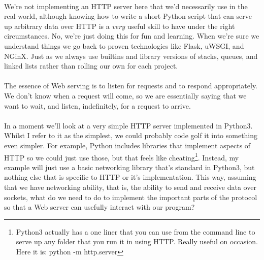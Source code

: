 \paragraph{} We're not implementing an HTTP server here that we'd necessarily use in the real world, although knowing how to write a short Python script that can serve up arbitrary data over HTTP is a \emph{very} useful skill to have under the right circumstances. No, we're just doing this for fun and learning. When we're sure we understand things we go back to proven technologies like Flask, uWSGI, and NGinX. Just as we always use builtins and library versions of stacks, queues, and linked lists rather than rolling our own for each project.

\paragraph{} The essence of Web serving is to listen for requests and to respond appropriately. We don't know when a request will come, so we are essentially saying that we want to wait, and listen, indefinitely, for a request to arrive.

\paragraph{} In a moment we'll look at a very simple HTTP server implemented in Python3. Whilst I refer to it as the simplest, we could probably code golf it into something even simpler. For example, Python includes libraries that implement aspects of HTTP so we could just use those, but that feels like cheating\footnote{Python3 actually has a one liner that you can use from the command line to serve up any folder that you run it in using HTTP. Really useful on occasion. Here it is: python -m http.server}. Instead, my example will just use a basic networking library that's standard in Python3, but nothing else that is specific to HTTP or it's implementation. This way, assuming that we have networking ability, that is, the ability to send and receive data over sockets, what do we need to do to implement the important parts of the protocol so that a Web server can usefully interact with our program?


